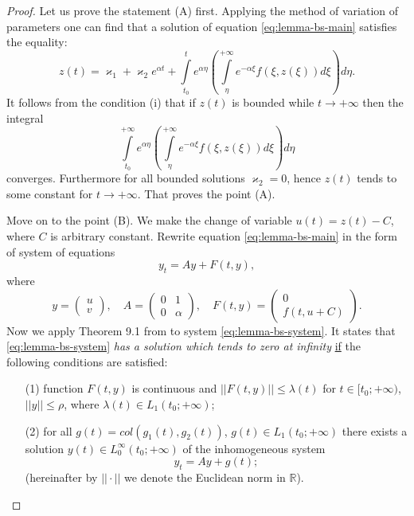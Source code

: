 \begin{proof}
	Let us prove the statement (A) first.
	Applying the method of variation of parameters one can find that a solution of equation \eqref{eq:lemma-bs-main} satisfies the equality:
	\begin{equation}
		z(t) = \varkappa_1 + \varkappa_2 e^{\alpha t} + \int \limits_{t_0}^{t} e^{\alpha \eta} \left( \int \limits_{\eta}^{+\infty} e^{-\alpha \xi} f(\xi, z(\xi)) d\xi \right) d\eta.
	\end{equation}
	It follows from the condition (i) that if $z(t)$ is bounded while $t \to +\infty$ then the integral
	\begin{equation}
		\int \limits_{t_0}^{+\infty} e^{\alpha \eta} \left( \int \limits_{\eta}^{+\infty} e^{-\alpha \xi} f(\xi, z(\xi)) d\xi \right) d\eta
	\end{equation}
	converges.
	Furthermore for all bounded solutions $\varkappa_2 = 0$, hence $z(t)$ tends to some constant for $t \to +\infty$.
	That proves the point (A).
	
	Move on to the point (B).
	We make the change of variable $u(t) = z(t) - C$, where $C$ is arbitrary constant.
	Rewrite equation \eqref{eq:lemma-bs-main} in the form of system of equations
	\begin{equation}
		y_t = Ay + F(t, y),
		\label{eq:lemma-bs-system}	
	\end{equation}
	where
	\begin{equation*}
		y = \begin{pmatrix}
			u \\ v
		\end{pmatrix}, \quad
		A = \begin{pmatrix}
			0 & 1 \\
			0 & \alpha
		\end{pmatrix}, \quad
		F(t, y) = \begin{pmatrix}
			0 \\ f(t, u + C)
		\end{pmatrix}.
	\end{equation*}
	Now we apply Theorem 9.1 from \cite[Chapter XII]{Hartman} to system \eqref{eq:lemma-bs-system}.
	It states that \eqref{eq:lemma-bs-system} {\it has a solution which tends to zero at infinity} \underline{if} the following conditions are satisfied:
	\begin{itemize}
		\item[(1)] function $F(t, y)$ is continuous and $||F(t, y)|| \le \lambda(t)$ for $t \in [t_0; +\infty)$, $||y|| \le \rho$, where $\lambda(t) \in L_1(t_0; +\infty)$;
		\item[(2)] for all $g(t) = col(g_1(t), g_2(t))$, $g(t) \in L_1(t_0; +\infty)$ there exists a solution $y(t) \in L_0^{\infty}(t_0; +\infty)$ of the inhomogeneous system
		\begin{equation}
			y_t = Ay + g(t);
			\label{eq:lemma-bs-hartman}
		\end{equation}
		(hereinafter by $||\cdot||$ we denote the Euclidean norm in $\mathbb{R}$).
	\end{itemize}
	

\end{proof}

